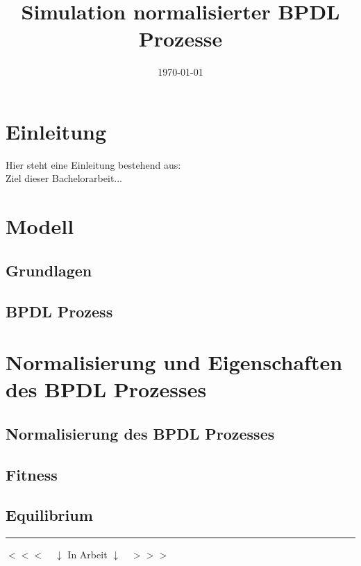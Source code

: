 \documentclass[11pt, a4paper, german]{article}
\date{\today}
\title{Simulation normalisierter BPDL Prozesse}
\begin{document}
\maketitle
\tableofcontents

\clearpage


\section{Einleitung}
Hier steht eine Einleitung bestehend aus:\\
Ziel dieser Bachelorarbeit...\\


\clearpage
\section{Modell}

	\subsection{Grundlagen}
	
	\subsection{BPDL Prozess}
	
		
	
	
\clearpage
\section{Normalisierung und Eigenschaften des BPDL Prozesses}

\subsection{Normalisierung des BPDL Prozesses}

	\subsection{Fitness}
	
	\subsection{Equilibrium}


\clearpage

\noindent\rule{\textwidth}{2pt}
\begin{center}
	$ <<< \quad \downarrow $ In Arbeit $ \downarrow \quad >>> $
\end{center}
	
\end{document}
